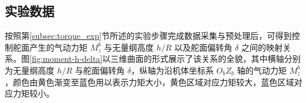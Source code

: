 




\subsection{实验数据}

按照第\ref{subsec:torque_exp}节所述的实验步骤完成数据采集与预处理后，可得到控制舵面产生的气动力矩 $M_z^b$ 与无量纲高度 $h/R$ 以及舵面偏转角 $\delta$ 之间的映射关系。图\ref{fig:moment-h-delta}以三维曲面的形式展示了该关系的全貌，其中横轴分别为无量纲高度 $h/R$ 与舵面偏转角 $\delta$，纵轴为沿机体坐标系 $O_bZ_b$ 轴的气动力矩 $M_z^b$，颜色由黄色渐变至蓝色用以表示力矩大小，黄色区域对应力矩较大，蓝色区域对应力矩较小。

